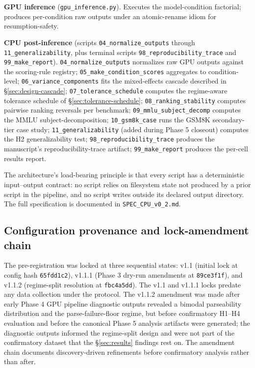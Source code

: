 \documentclass[11pt]{article}
\begin{document}
\textbf{GPU inference} (\texttt{gpu\_inference.py}). Executes the model-condition factorial; produces per-condition raw outputs under an atomic-rename idiom for resumption-safety.

\textbf{CPU post-inference} (scripts \texttt{04\_normalize\_outputs} through \texttt{11\_generalizability}, plus terminal scripts \texttt{98\_reproducibility\_trace} and \texttt{99\_make\_report}). \texttt{04\_normalize\_outputs} normalizes raw GPU outputs against the scoring-rule registry; \texttt{05\_make\_condition\_scores} aggregates to condition-level; \texttt{06\_variance\_components} fits the mixed-effects cascade described in §\ref{sec:design-cascade}; \texttt{07\_tolerance\_schedule} computes the regime-aware tolerance schedule of §\ref{sec:tolerance-schedule}; \texttt{08\_ranking\_stability} computes pairwise ranking reversals per benchmark; \texttt{09\_mmlu\_subject\_decomp} computes the MMLU subject-decomposition; \texttt{10\_gsm8k\_case} runs the GSM8K secondary-tier case study; \texttt{11\_generalizability} (added during Phase 5 closeout) computes the H2 generalizability test; \texttt{98\_reproducibility\_trace} produces the manuscript's reproducibility-trace artifact; \texttt{99\_make\_report} produces the per-cell results report.

The architecture's load-bearing principle is that every script has a deterministic input--output contract: no script relies on filesystem state not produced by a prior script in the pipeline, and no script writes outside its declared output directory. The full specification is documented in \texttt{SPEC\_CPU\_v0\_2.md}.

\subsection{Configuration provenance and lock-amendment chain}
\label{app:lock-chain}

The pre-registration was locked at three sequential states: v1.1 (initial lock at config hash \texttt{65fdd1c2}), v1.1.1 (Phase 3 dry-run amendments at \texttt{89ce3f1f}), and v1.1.2 (regime-split resolution at \texttt{fbc4a5dd}). The v1.1 and v1.1.1 locks predate any data collection under the protocol. The v1.1.2 amendment was made after early Phase 4 GPU pipeline diagnostic outputs revealed a bimodal parseability distribution and the parse-failure-floor regime, but before confirmatory H1--H4 evaluation and before the canonical Phase 5 analysis artifacts were generated; the diagnostic outputs informed the regime-split design and were not part of the confirmatory dataset that the §\ref{sec:results} findings rest on. The amendment chain documents discovery-driven refinements before confirmatory analysis rather than after.
\end{document}
